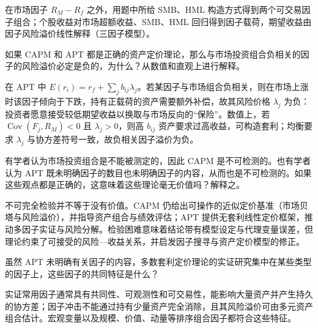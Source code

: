 \begin{solution}
在市场因子 $R_M-R_f$ 之外，用题中所给 SMB、HML 构造方式得到两个可交易因子组合；个股收益对市场超额收益、SMB、HML 回归得到因子载荷，期望收益由因子风险溢价线性解释（三因子模型）。
\end{solution}
\begin{problem}
 如果 CAPM 和 APT 都是正确的资产定价理论，那么与市场投资组合负相关的因子的风险溢价必定是负的，为什么？从数值和直观上进行解释。
\end{problem}
\begin{solution}
在 APT 中 $E(r_i)=r_f+\sum_j b_{ij}\lambda_j$。若某因子与市场组合负相关，则在市场上涨时该因子倾向于下跌，持有正载荷的资产需要额外补偿，故其风险价格 $\lambda_j$ 为负：投资者愿意接受较低期望收益以换取与市场反向的“保险”。数值上，若 $\operatorname{Cov}(F_j,R_M)<0$ 且 $\lambda_j>0$，则高 $b_{ij}$ 资产要求过高收益，可构造套利；均衡要求 $\lambda_j$ 与协方差符号一致，故负相关因子溢价为负。
\end{solution}
\begin{problem}
 有学者认为市场投资组合是不能被测定的，因此 CAPM 是不可检测的。也有学者认为 APT 既未明确因子的数目也未明确因子的内容，从而也是不可检测的。如果这些观点都是正确的，这意味着这些理论毫无价值吗？解释之。
\end{problem}
\begin{solution}
不可完全检验并不等于没有价值。CAPM 仍给出可操作的近似定价基准（市场贝塔与风险溢价），并指导资产组合与绩效评估；APT 提供无套利线性定价框架，推动多因子实证与风险分解。检验困难意味着结论带有模型设定与代理变量误差，但理论约束了可接受的风险—收益关系，并启发因子搜寻与资产定价模型的修正。
\end{solution}
\begin{problem}
 虽然 APT 未明确有关因子的内容，多数套利定价理论的实证研究集中在某些类型的因子上，这些因子的共同特征是什么？
\end{problem}
\begin{solution}
实证常用因子通常具有共同性、可观测性和可交易性，能影响大量资产并产生持久的协方差；因子冲击不能通过持有少量资产完全消除，且其风险溢价可由多元资产组合估计。宏观变量以及规模、价值、动量等排序组合因子都符合这些特征。
\end{solution}

